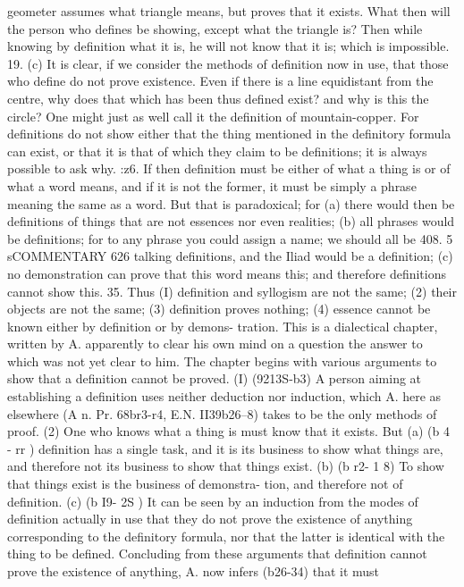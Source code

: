 {{{{{{{{{{{{{{{{{{{geometer assumes what triangle means, but proves that it exists.
What then will the person who defines be showing, except what
the triangle is? Then while knowing by definition what it is, he
will not know that it is; which is impossible.
19. (c) It is clear, if we consider the methods of definition now
in use, that those who define do not prove existence. Even if
there is a line equidistant from the centre, why does that which has
been thus defined exist? and why is this the circle? One might
just as well call it the definition of mountain-copper. For
definitions do not show either that the thing mentioned in the
definitory formula can exist, or that it is that of which they claim
to be definitions; it is always possible to ask why.
:z6. If then definition must be either of what a thing is or of
what a word means, and if it is not the former, it must be simply
a phrase meaning the same as a word. But that is paradoxical;
for (a) there would then be definitions of things that are not
essences nor even realities; (b) all phrases would be definitions;
for to any phrase you could assign a name; we should all be
408.
5 sCOMMENTARY
626
talking definitions, and the Iliad would be a definition; (c) no
demonstration can prove that this word means this; and therefore
definitions cannot show this.
35. Thus (I) definition and syllogism are not the same; (2)
their objects are not the same; (3) definition proves nothing;
(4) essence cannot be known either by definition or by demons-
tration.
This is a dialectical chapter, written by A. apparently to clear
his own mind on a question the answer to which was not yet clear
to him. The chapter begins with various arguments to show that
a definition cannot be proved. (I) (9213S-b3) A person aiming at
establishing a definition uses neither deduction nor induction,
which A. here as elsewhere (A n. Pr. 68br3-r4, E.N. II39b26--8)
takes to be the only methods of proof. (2) One who knows what
a thing is must know that it exists. But (a) (b 4 - rr ) definition
has a single task, and it is its business to show what things are,
and therefore not its business to show that things exist. (b)
(b r2- 1 8) To show that things exist is the business of demonstra-
tion, and therefore not of definition. (c) (b I9- 2S ) It can be seen
by an induction from the modes of definition actually in use that
they do not prove the existence of anything corresponding to
the definitory formula, nor that the latter is identical with the
thing to be defined.
Concluding from these arguments that definition cannot prove
the existence of anything, A. now infers (b26-34) that it must
}}}}}}}}}}}}}}}}}}}
